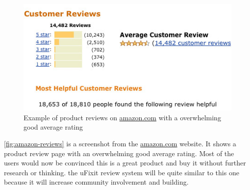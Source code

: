 		\begin{figure}[H]
			\centering
			\includegraphics[width=0.7\linewidth]{../images/how-to-get-amazon-reviews-kindle.jpg}
			\caption{Example of product reviews on \url{amazon.com} with a overwhelming good average rating}
			\label{fig:amazon-reviews}
		\end{figure}
		
		\autoref{fig:amazon-reviews} is a screenshot from the \url{amazon.com} website. It shows a product review page with an overwhelming good average rating. Most of the users would now be convinced this is a great product and buy it without further research or thinking. the uFixit review system will be quite similar to this one because it will increase community involvement and building.
